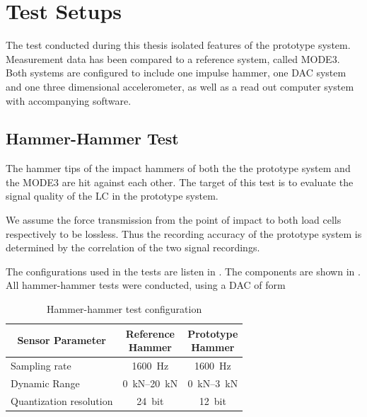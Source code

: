 \chapter{Test Setups}
\label{chap:\currfilebase}

The test conducted during this thesis isolated features of the prototype system. Measurement data has been compared to a reference system, called MODE3. Both systems are configured to include one impulse hammer, one \ac{DAC} system and one three dimensional accelerometer, as well as a read out computer system with accompanying software.

\section{Hammer-Hammer Test}

The hammer tips of the impact hammers of both the the prototype system and the MODE3 are hit against each other. The target of this test is to evaluate the signal quality of the \ac{LC} in the prototype system.

We assume the force transmission from the point of impact to both load cells respectively to be lossless. Thus the recording accuracy of the prototype system is determined by the correlation of the two signal recordings.

The configurations used in the tests are listen in . The components are shown in . All hammer-hammer tests were conducted, using a \ac{DAC} of form 

\begin{table}
    \centering
    {\renewcommand{\arraystretch}{1}%
    \footnotesize
    \begin{tabular}{lcc}
        \toprule
        \multicolumn{1}{c}{Sensor Parameter} & \makecell{Reference\\Hammer} & \makecell{Prototype\\Hammer}\\
        \midrule
        Sampling rate & \SI{1600}{\hertz} & \SI{1600}{\hertz}\\
        Dynamic Range & \SIrange{0}{20}{\kilo\newton} & \SIrange{0}{3}{\kilo\newton}\\
        Quantization resolution & \SI{24}{bit} & \SI{12}{bit}\\
        \bottomrule
    \end{tabular}
    \caption[Hammer-Hammer Test Configuration]{Hammer-hammer test configuration}
    \label{tab:hh_config}
    \normalsize
    }
\end{table}

